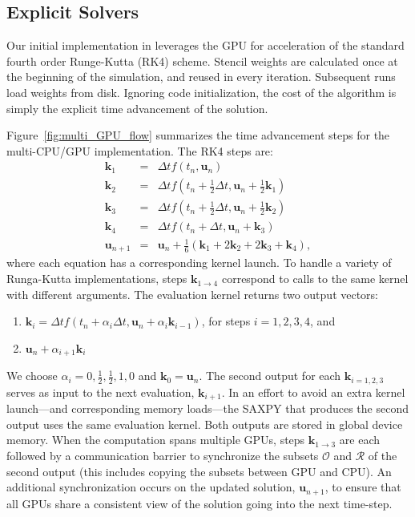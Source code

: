 \documentclass{report}
\begin{document}
\subsection{Explicit Solvers}


Our initial implementation in \cite{BolligFlyerErlebacher2012} leverages the GPU for acceleration of the standard fourth order Runge-Kutta (RK4) scheme. Stencil weights are calculated once at the beginning of the simulation, and reused in every iteration. Subsequent runs load weights from disk. Ignoring code initialization, the cost of the algorithm is simply the explicit time advancement of the solution. 

Figure~\ref{fig:multi_GPU_flow} summarizes the time advancement steps for the multi-CPU/GPU implementation. The RK4 steps are: 
\begin{eqnarray} 
\mathbf{k}_1 &=& \Delta t f(t_n, \mathbf{u}_n) \nonumber \\
\mathbf{k}_2 &=& \Delta t f(t_n+\frac{1}{2}\Delta t, \mathbf{u}_n + \frac{1}{2}\mathbf{k}_1) \nonumber \\
\mathbf{k}_3 &=& \Delta t f(t_n+\frac{1}{2}\Delta t, \mathbf{u}_n + \frac{1}{2}\mathbf{k}_2)  \label{eqn:rk4}\\
\mathbf{k}_4 &=& \Delta t f(t_n+\Delta t, \mathbf{u}_n + \mathbf{k}_3) \nonumber \\
\mathbf{u}_{n+1} &=& \mathbf{u}_{n} + \frac{1}{6}(\mathbf{k}_1 + 2\mathbf{k}_2 + 2\mathbf{k}_3 +\mathbf{k}_4), \nonumber
\end{eqnarray}
where each equation has a corresponding kernel launch. To handle a variety of Runga-Kutta implementations, steps $\mathbf{k}_{1\rightarrow4}$ correspond to calls to the same kernel with different arguments. The evaluation kernel returns two output vectors: 
\begin{enumerate} 
\item $\mathbf{k}_i = \Delta t f(t_n + \alpha_{i} \Delta t, \mathbf{u}_n + \alpha_{i} \mathbf{k}_{i-1})$, for steps $i=1,2,3,4$, and
\item  $\mathbf{u}_n + \alpha_{i+1} \mathbf{k}_i$
\end{enumerate} 
We choose $\alpha_{i}=0, \frac{1}{2}, \frac{1}{2}, 1, 0$ and $\mathbf{k}_{0} = \mathbf{u}_n$. The second output for each $\mathbf{k}_{i=1,2,3}$ serves as input to the next evaluation, $\mathbf{k}_{i+1}$. In an effort to avoid an extra kernel launch---and corresponding memory loads---the SAXPY that produces the second output uses the same evaluation kernel. Both outputs are stored in global device memory. When the computation spans multiple GPUs, steps $\mathbf{k}_{1\rightarrow3}$ are each followed by a communication barrier to synchronize the subsets $\mathcal{O}$ and $\mathcal{R}$ of the second output (this includes copying the subsets between GPU and CPU). An additional synchronization occurs on the updated solution, $\mathbf{u}_{n+1}$, to ensure that all GPUs share a consistent view of the solution going into the next time-step.
\end{document}
